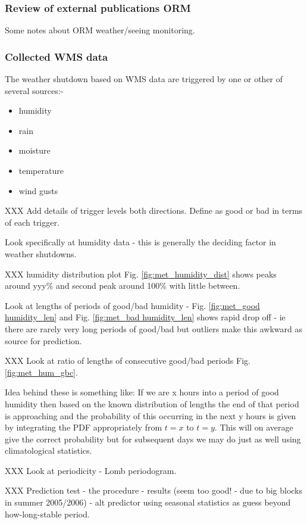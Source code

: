 \subsubsection{Review of external publications ORM}
Some notes about ORM weather/seeing monitoring.


\subsubsection{Collected WMS data}

The weather shutdown based on WMS data are triggered by one or other of several sources:-
\begin{itemize}
\item humidity
\item rain
\item moisture
\item temperature
\item wind gusts
\end{itemize}

XXX Add details of trigger levels both directions. Define as good or bad in terms of each trigger.

Look specifically at humidity data - this is generally the deciding factor in weather shutdowns.

XXX humidity distribution plot Fig. \ref{fig:met_humidity_dist} shows peaks around yyy\% and second peak around 100\% with little between.

Look at lengths of periods of good/bad humidity - Fig. \ref{fig:met_good humidity_len} and Fig. \ref{fig:met_bad humidity_len} shows rapid drop off - ie there are rarely very long periods of good/bad but outliers make this awkward as source for prediction.

XXX Look at ratio of lengths of consecutive good/bad periods Fig. \ref{fig:met_hum_gbc}.

Idea behind these is something like: If we are x hours into a period of good humidity then based on the known distribution of lengths the end of that period is approaching and the probability of this occurring in the next y hours is given by integrating the PDF appropriately from $t=x$ to $t=y$. This will on average give the correct probability but for subsequent days we may do just as well using climatological statistics.

XXX Look at periodicity - Lomb periodogram.



XXX Prediction test - the procedure - results (seem too good! - due to big blocks in summer 2005/2006) - alt predictor using seasonal statistics as guess beyond how-long-stable period.

